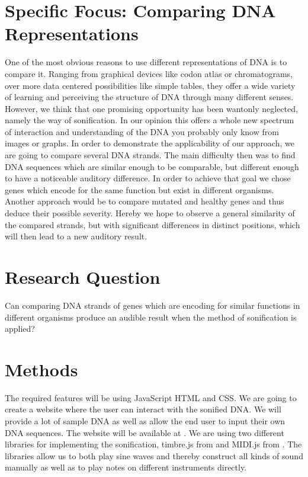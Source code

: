 \documentclass[10pt]{article}
\begin{document}
\section{Specific Focus: Comparing DNA Representations}

One of the most obvious reasons to use different representations of DNA is to compare it. Ranging from graphical devices like codon atlas or chromatograms, over more data centered possibilities like simple tables, they offer a wide variety of learning and perceiving the structure of DNA through many different senses.
However, we think that one promising opportunity has been wantonly neglected, namely the way of sonification. In our opinion this offers a whole new spectrum of interaction and understanding of the DNA you probably only know from images or graphs.
In order to demonstrate the applicability of our approach, we are going to compare several DNA strands. The main difficulty then was to find DNA sequences which are similar enough to be comparable, but different enough to have a noticeable auditory difference.
In order to achieve that goal we chose genes which encode for the same function but exist in different organisms. Another approach would be to compare mutated and healthy genes and thus deduce their possible severity. Hereby we hope to observe a general similarity of the compared strands, but with significant differences in distinct positions, which will then lead to a new auditory result.

\section{Research Question}
Can comparing DNA strands of genes which are encoding for similar functions in different organisms produce an audible result when the method of sonification is applied?

\section{Methods}
The required features will be using JavaScript HTML and CSS. We are going to create a website where the user can interact with the sonified DNA. We will provide a lot of sample DNA as well as allow the end user to input their own DNA sequences. The website will be available at \cite{site:letthednaspeak}. We are using two different libraries for implementing the sonification, timbre.js from \cite{libs:timbrejs} and MIDI.js from \cite{libs:midijs}. The libraries allow us to both play sine waves and thereby construct all kinds of sound manually as well as to play notes on different instruments directly. 
\end{document}
